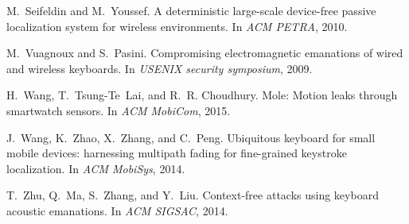 \documentclass[conference]{IEEEtran}
\begin{document}
\begin{thebibliography}{10}
M.~Seifeldin and M.~Youssef.
\newblock A deterministic large-scale device-free passive localization system
  for wireless environments.
\newblock In {\em ACM PETRA}, 2010.

M.~Vuagnoux and S.~Pasini.
\newblock Compromising electromagnetic emanations of wired and wireless
  keyboards.
\newblock In {\em USENIX security symposium}, 2009.

H.~Wang, T.~Tsung-Te~Lai, and R.~R. Choudhury.
\newblock Mole: Motion leaks through smartwatch sensors.
\newblock In {\em ACM MobiCom}, 2015.

J.~Wang, K.~Zhao, X.~Zhang, and C.~Peng.
\newblock Ubiquitous keyboard for small mobile devices: harnessing multipath
  fading for fine-grained keystroke localization.
\newblock In {\em ACM MobiSys}, 2014.

T.~Zhu, Q.~Ma, S.~Zhang, and Y.~Liu.
\newblock Context-free attacks using keyboard acoustic emanations.
\newblock In {\em ACM SIGSAC}, 2014.

\end{thebibliography}
  
\end{document}
